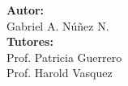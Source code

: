 \begin{titlepage}
	\begin{center}
	\membrete
	\vfill
	\titulo
	\vfill
	\textbf{Autor:}\\
	Gabriel A. N\'{u}\~{n}ez N.\\
	\vfill
	\textbf{Tutores:} \\
	Prof. Patricia Guerrero \\
	Prof. Harold Vasquez
	\vfill
	\fecha
	\end{center}
\end{titlepage}